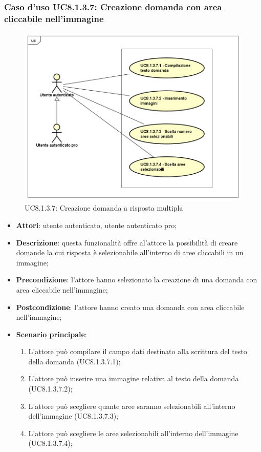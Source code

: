 \subsubsection{Caso d'uso UC8.1.3.7: Creazione domanda con area cliccabile nell'immagine}
\label{UC8.1.3.7}
\begin{figure}[h]
	\centering
	\includegraphics[scale=0.5,keepaspectratio]{UML/UC8_1_3_7.png}
	\caption{UC8.1.3.7: Creazione domanda a risposta multipla}
\end{figure}
\FloatBarrier
\begin{itemize}
	\item \textbf{Attori}: utente autenticato, utente autenticato pro;
	\item \textbf{Descrizione}: questa funzionalità offre al'attore la possibilità di creare domande la cui risposta è selezionabile all'interno di aree cliccabili in un immagine;
	\item \textbf{Precondizione}: l'attore hanno selezionato la creazione di una domanda con area cliccabile nell'immagine; 
	\item \textbf{Postcondizione}: l'attore hanno creato una domanda con area cliccabile nell'immagine;
	\item \textbf{Scenario principale}:
		\begin{enumerate}
	       	\item L'attore può compilare il campo dati destinato alla scrittura del testo della domanda (UC8.1.3.7.1);
	        \item L'attore può inserire una immagine relativa al testo della domanda (UC8.1.3.7.2);
			\item L'attore può scegliere quante aree saranno selezionabili all'interno dell'immagine (UC8.1.3.7.3);
			\item L'attore può scegliere le aree selezionabili all'interno dell'immagine (UC8.1.3.7.4);
	 	\end{enumerate}
\end{itemize}

